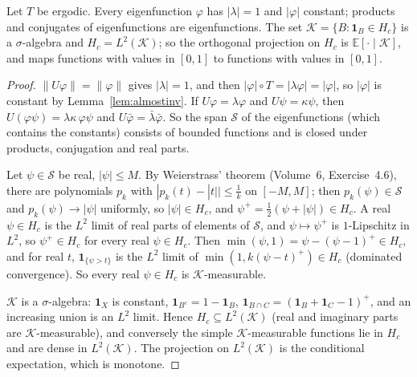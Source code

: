\begin{lemma}\label{lem:compactpart}
Let $T$ be ergodic. Every eigenfunction $\varphi$ has $|\lambda|=1$ and $|\varphi|$ constant; products and conjugates of eigenfunctions are eigenfunctions. The set $\mathcal K=\{B:\mathbf 1_B\in H_c\}$ is a $\sigma$-algebra and $H_c=L^2(\mathcal K)$;
so the orthogonal projection on $H_c$ is $\mathbb E[\cdot\mid\mathcal K]$, and maps functions with values in $[0,1]$ to functions with values in $[0,1]$.
\end{lemma}
\begin{proof}
$\|U\varphi\|=\|\varphi\|$ gives $|\lambda|=1$, and then $|\varphi|\circ T=|\lambda\varphi|=|\varphi|$, so $|\varphi|$ is constant by Lemma~\ref{lem:almostinv}. If $U\varphi=\lambda\varphi$ and $U\psi=\kappa\psi$, then
$U(\varphi\psi)=\lambda\kappa\,\varphi\psi$ and $U\bar\varphi=\bar\lambda\bar\varphi$. So the span $\mathcal S$ of the eigenfunctions (which contains the constants) consists of bounded functions and is closed under products, conjugation and real parts.

Let $\psi\in\mathcal S$ be real, $|\psi|\le M$. By Weierstrass' theorem (Volume~6, Exercise~4.6), there are polynomials $p_k$ with $|p_k(t)-|t||\le\frac1k$ on $[-M,M]$; then $p_k(\psi)\in\mathcal S$ and $p_k(\psi)\to|\psi|$ uniformly, so
$|\psi|\in H_c$, and $\psi^+=\frac12(\psi+|\psi|)\in H_c$. A real $\psi\in H_c$ is the $L^2$ limit of real parts of elements of $\mathcal S$, and $\psi\mapsto\psi^+$ is $1$-Lipschitz in $L^2$, so $\psi^+\in H_c$ for every real $\psi\in H_c$.
Then $\min(\psi,1)=\psi-(\psi-1)^+\in H_c$, and for real $t$, $\mathbf 1_{\{\psi>t\}}$ is the $L^2$ limit of $\min(1,k(\psi-t)^+)\in H_c$ (dominated convergence). So every real $\psi\in H_c$ is $\mathcal K$-measurable.

$\mathcal K$ is a $\sigma$-algebra: $\mathbf 1_X$ is constant, $\mathbf 1_{B^c}=1-\mathbf 1_B$, $\mathbf 1_{B\cap C}=(\mathbf 1_B+\mathbf 1_C-1)^+$, and an increasing union is an $L^2$ limit. Hence $H_c\subseteq L^2(\mathcal K)$ (real and imaginary parts are $\mathcal K$-measurable), and
conversely the simple $\mathcal K$-measurable functions lie in $H_c$ and are dense in $L^2(\mathcal K)$. The projection on $L^2(\mathcal K)$ is the conditional expectation, which is monotone.
\end{proof}

